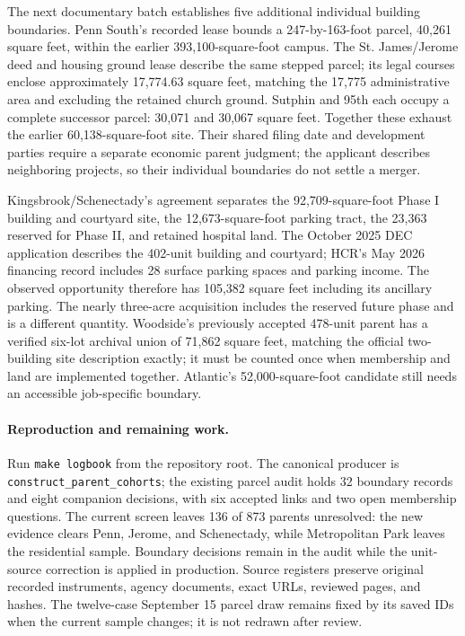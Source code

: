 The next documentary batch establishes five additional individual building
boundaries. Penn South's recorded lease bounds a 247-by-163-foot parcel,
40,261 square feet, within the earlier 393,100-square-foot campus. The St.
James/Jerome deed and housing ground lease describe the same stepped parcel;
its legal courses enclose approximately 17,774.63 square feet, matching the
17,775 administrative area and excluding the retained church ground.
Sutphin and 95th each occupy a complete successor parcel: 30,071 and 30,067
square feet. Together these exhaust the earlier 60,138-square-foot site.
Their shared filing date and development parties require a separate economic
parent judgment; the applicant describes neighboring projects, so their
individual boundaries do not settle a merger.

Kingsbrook/Schenectady's agreement separates the 92,709-square-foot Phase I
building and courtyard site, the 12,673-square-foot parking tract, the 23,363
reserved for Phase II, and retained hospital land. The October 2025 DEC
application describes the 402-unit building and courtyard; HCR's May 2026
financing record includes 28 surface parking spaces and parking income.
The observed opportunity therefore has 105,382 square feet including its
ancillary parking. The nearly three-acre acquisition includes the reserved
future phase and is a different quantity. Woodside's previously accepted
478-unit parent has a verified six-lot archival union of 71,862 square feet,
matching the official two-building site description exactly; it must be
counted once when membership and land are implemented together. Atlantic's
52,000-square-foot candidate still needs an accessible job-specific boundary.

\paragraph{Reproduction and remaining work.}
Run \texttt{make logbook} from the repository root. The canonical producer is
\texttt{construct\_parent\_cohorts}; the existing parcel audit holds 32
boundary records and eight companion decisions, with six accepted links and
two open membership questions. The current screen leaves 136 of 873 parents
unresolved: the new evidence clears Penn, Jerome, and Schenectady, while
Metropolitan Park leaves the residential sample. Boundary decisions remain in the audit while
the unit-source correction is applied in production. Source registers preserve
original recorded instruments, agency documents, exact URLs, reviewed pages,
and hashes. The twelve-case September 15 parcel draw remains fixed by its
saved IDs when the current sample changes; it is not redrawn after review.
